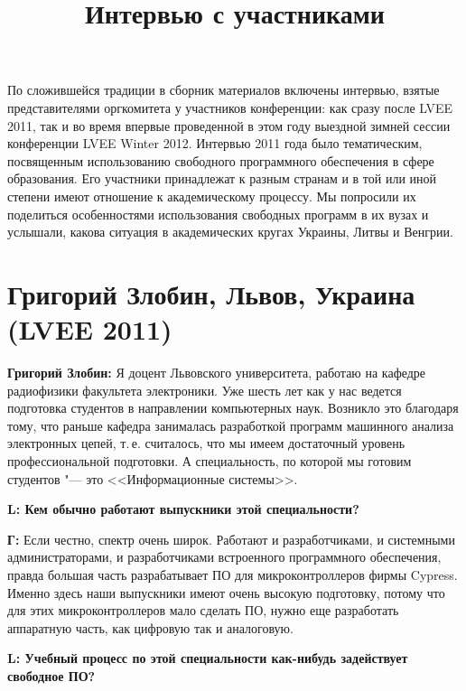 \documentclass[10pt, a5paper]{article}
\begin{document}
\title{Интервью с участниками}
\date{}
\maketitle

По сложившейся традиции в сборник материалов включены интервью, взятые представителями оргкомитета у участников конференции: как сразу после LVEE 2011, так и во время впервые проведенной в этом году выездной зимней сессии конференции LVEE Winter 2012. Интервью 2011 года было тематическим, посвященным использованию свободного программного обеспечения в сфере образования. Его участники принадлежат к разным странам и в той или иной степени имеют отношение к академическому процессу. Мы попросили их поделиться особенностями использования свободных программ в их вузах и услышали, какова ситуация в академических кругах Украины, Литвы и Венгрии.

\section[Григорий Злобин, Львов, Украина (LVEE 2011)]{Григорий Злобин, Львов, Украина \linebreak (LVEE 2011)}

{\noindent \bf Григорий Злобин:} Я доцент Львовского университета, работаю на кафедре радиофизики факультета электроники. Уже шесть лет как у нас ведется подготовка студентов в направлении компьютерных наук. Возникло это благодаря тому, что раньше кафедра занималась разработкой программ машинного анализа электронных цепей, т.\,е. считалось, что мы имеем достаточный уровень профессиональной подготовки. А специальность, по которой мы готовим студентов "--- это <<Информационные системы>>.

{\noindent \bf L: Кем обычно работают выпускники этой специальности?}

{\noindent \bf Г:} Если честно, спектр очень широк. Работают и разработчиками, и системными администраторами, и разработчиками встроенного программного обеспечения, правда большая часть разрабатывает ПО для микроконтроллеров фирмы Cypress. Именно здесь наши выпускники имеют очень высокую подготовку, потому что для этих микроконтроллеров мало сделать ПО, нужно еще разработать аппаратную часть, как цифровую так и аналоговую. 

{\noindent \bf L: Учебный процесс по этой специальности как-нибудь задействует свободное ПО?}
\end{document}
